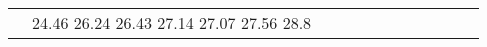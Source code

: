 \documentclass[runningheads]{llncs}
\begin{document}
\begin{table}[!ht]
\begin{tabular}{|p{7em}|p{2.5em}|p{2.5em}|p{3em}|p{2.5em}|p{3em}|p{2.5em}|p{3em}|p{2.5em}|p{3em}|p{2.5em}|p{3em}|}
& 24.46 \newline{}26.24 \newline{}26.43 \newline{}27.14 \newline{}27.07 \newline{}27.56 \newline{}28.8
\end{tabular}
\end{table}
\end{document}
